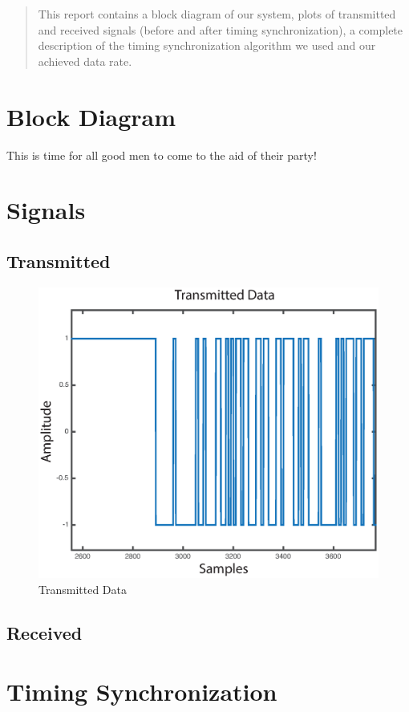 \documentclass[12pt]{article}
\begin{document}
\maketitle

\begin{abstract}
This report contains a block diagram of our system, plots of transmitted and received signals (before and after timing synchronization), a complete description of the timing synchronization algorithm we used and our achieved data rate.
\end{abstract}

\section{Block Diagram}
This is time for all good men to come to the aid of their party!

\section{Signals}
\subsection{Transmitted}
\begin{figure}[!ht]
\centering
\includegraphics[width=.8\textwidth]{plots/tx.eps}
\caption{Transmitted Data}
\label{fig:tx}
\end{figure}
    
\subsection{Received}

\section{Timing Synchronization}
\end{document}

